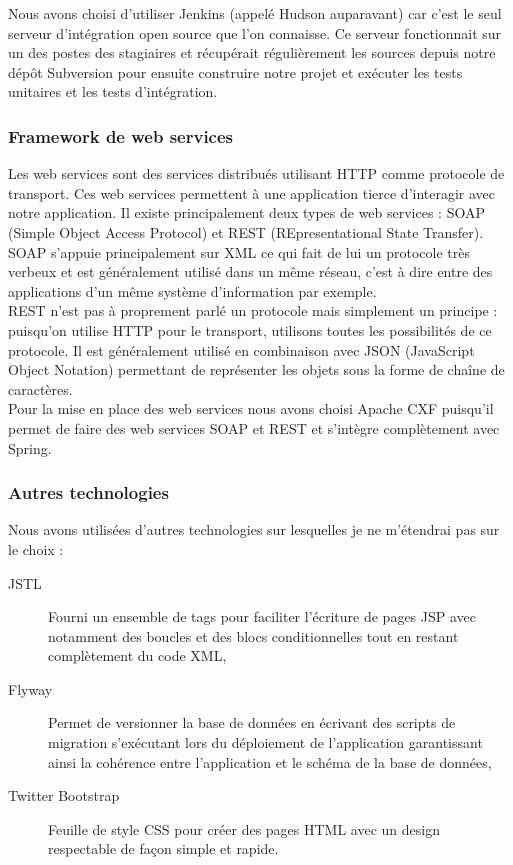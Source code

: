 Nous avons choisi d'utiliser Jenkins (appelé Hudson auparavant) car c'est le seul serveur d'intégration open source que l'on connaisse. Ce serveur fonctionnait sur un des postes des stagiaires et récupérait régulièrement les sources depuis notre dépôt Subversion pour ensuite construire notre projet et exécuter les tests unitaires et les tests d'intégration.

\subsubsection{Framework de web services}

Les web services sont des services distribués utilisant HTTP comme protocole de transport. Ces web services permettent à une application tierce d’interagir avec notre application. Il existe principalement deux types de web services : SOAP (Simple Object Access Protocol) et REST (REpresentational State Transfer).\\

SOAP s'appuie principalement sur XML ce qui fait de lui un protocole très verbeux et est généralement utilisé dans un même réseau, c'est à dire entre des applications d'un même système d'information par exemple.\\

REST n'est pas à proprement parlé un protocole mais simplement un principe : puisqu'on utilise HTTP pour le transport, utilisons toutes les possibilités de ce protocole. Il est généralement utilisé en combinaison avec JSON (JavaScript Object Notation) permettant de représenter les objets sous la forme de chaîne de caractères.\\

Pour la mise en place des web services nous avons choisi Apache CXF puisqu'il permet de faire des web services SOAP et REST et s'intègre complètement avec Spring.

\subsubsection{Autres technologies}

Nous avons utilisées d'autres technologies sur lesquelles je ne m'étendrai pas sur le choix :

\begin{description}
	\item[JSTL] Fourni un ensemble de tags pour faciliter l'écriture de pages JSP avec notamment des boucles et des blocs conditionnelles tout en restant complètement du code XML,
	
	\item[Flyway] Permet de versionner la base de données en écrivant des scripts de migration s'exécutant lors du déploiement de l'application garantissant ainsi la cohérence entre l'application et le schéma de la base de données,
	
	\item[Twitter Bootstrap] Feuille de style CSS pour créer des pages HTML avec un design respectable de façon simple et rapide.\\
\end{description}

